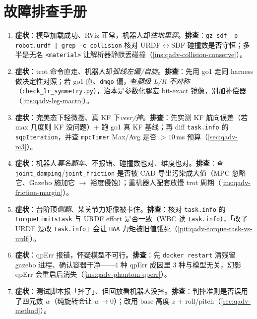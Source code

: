 \section*{故障排查手册}
\begin{enumerate}
  \item \textbf{症状}：模型加载成功、RViz 正常，机器人却\emph{往地里穿}。\textbf{排查}：\texttt{gz sdf -p robot.\allowbreak urdf | grep -c collision} 核对 URDF$\leftrightarrow$SDF 碰撞数是否守恒；多半是无名 \texttt{<material>} 让解析器静默丢碰撞（\cref{ins:qadv-collision-conserve}）。
  \item \textbf{症状}：trot 命令直走、机器人却\emph{弧线左偏/自旋}。\textbf{排查}：先用 go1 走同 harness 做决定性对照；若 go1 直、\texttt{dmgo} 偏，查\emph{腿级 L/R 不对称}（\texttt{check\_lr\_symmetry.\allowbreak py}），治本是参数化腿宏 bit-exact 镜像，别加补偿器（\cref{ins:qadv-leg-macro}）。
  \item \textbf{症状}：完美态下轻微摆、真 KF 下\emph{veer/摔}。\textbf{排查}：先实测 KF 航向误差（若 max 几度则 KF 没问题）+ 跑 go1 真 KF 基线；再 diff \texttt{task.info} 的 \texttt{sqpIteration}，并查 \texttt{mpcTimer} Max/Avg 是否 $>10$\,ms 预算（\cref{sec:qadv-rc3}）。
  \item \textbf{症状}：机器人\emph{莫名翻车}、不报错、碰撞数也对、维度也对。\textbf{排查}：查 \texttt{joint\_damping}/\allowbreak\texttt{joint\_friction} 是否被 CAD 导出污染成大值（MPC 忽略它、Gazebo 施加它 $\to$ 裕度侵蚀）；重机器人配套放慢 trot 周期（\cref{ins:qadv-friction-margin}）。
  \item \textbf{症状}：台阶顶\emph{侧翻}、某关节力矩像被卡住。\textbf{排查}：核对 \texttt{task.info} 的 \texttt{torqueLimitsTask} 与 URDF effort 是否一致（WBC 读 \texttt{task.info}），「改了 URDF 没改 \texttt{task.info}」会让 \texttt{HAA} 力矩被旧值饿死（\cref{pit:qadv-torque-task-vs-urdf}）。
  \item \textbf{症状}：qpErr 报错，怀疑模型不可行。\textbf{排查}：先 \texttt{docker restart} 清残留 gazebo 进程、确认容器干净——$4$ 种 qpErr 成因里 $3$ 种与模型无关，幻影 qpErr 会重启后消失（\cref{ins:qadv-phantom-qperr}）。
  \item \textbf{症状}：测试脚本报「摔了」、但回放看机器人没摔。\textbf{排查}：判摔准则是否误用了四元数 $w$（纯旋转会让 $w\to0$）；改用 base 高度 $z$ + roll/pitch（\cref{sec:qadv-method}）。
\end{enumerate}
